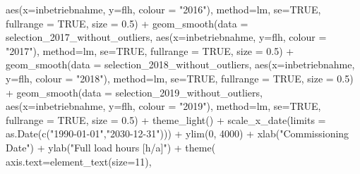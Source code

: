 \documentclass[a4paper,11pt]{article}
\newenvironment{Shaded}{\begin{snugshade}}{\end{snugshade}}
\newcommand{\AttributeTok}[1]{\textcolor[rgb]{0.77,0.63,0.00}{#1}}
\newcommand{\ConstantTok}[1]{\textcolor[rgb]{0.00,0.00,0.00}{#1}}
\newcommand{\DecValTok}[1]{\textcolor[rgb]{0.00,0.00,0.81}{#1}}
\newcommand{\FloatTok}[1]{\textcolor[rgb]{0.00,0.00,0.81}{#1}}
\newcommand{\FunctionTok}[1]{\textcolor[rgb]{0.00,0.00,0.00}{#1}}
\newcommand{\NormalTok}[1]{#1}
\newcommand{\SpecialCharTok}[1]{\textcolor[rgb]{0.00,0.00,0.00}{#1}}
\newcommand{\StringTok}[1]{\textcolor[rgb]{0.31,0.60,0.02}{#1}}
\begin{document}
\begin{Shaded}
\begin{Highlighting}[]
              \FunctionTok{aes}\NormalTok{(}\AttributeTok{x=}\NormalTok{inbetriebnahme, }\AttributeTok{y=}\NormalTok{flh, }\AttributeTok{colour =} \StringTok{"2016"}\NormalTok{), }
              \AttributeTok{method=}\NormalTok{lm, }\AttributeTok{se=}\ConstantTok{TRUE}\NormalTok{, }\AttributeTok{fullrange =} \ConstantTok{TRUE}\NormalTok{, }\AttributeTok{size =} \FloatTok{0.5}\NormalTok{)  }\SpecialCharTok{+}
  \FunctionTok{geom\_smooth}\NormalTok{(}\AttributeTok{data =}\NormalTok{ selection\_2017\_without\_outliers, }
              \FunctionTok{aes}\NormalTok{(}\AttributeTok{x=}\NormalTok{inbetriebnahme, }\AttributeTok{y=}\NormalTok{flh, }\AttributeTok{colour =} \StringTok{"2017"}\NormalTok{), }
              \AttributeTok{method=}\NormalTok{lm, }\AttributeTok{se=}\ConstantTok{TRUE}\NormalTok{, }\AttributeTok{fullrange =} \ConstantTok{TRUE}\NormalTok{, }\AttributeTok{size =} \FloatTok{0.5}\NormalTok{)  }\SpecialCharTok{+}
  \FunctionTok{geom\_smooth}\NormalTok{(}\AttributeTok{data =}\NormalTok{ selection\_2018\_without\_outliers, }
              \FunctionTok{aes}\NormalTok{(}\AttributeTok{x=}\NormalTok{inbetriebnahme, }\AttributeTok{y=}\NormalTok{flh, }\AttributeTok{colour =} \StringTok{"2018"}\NormalTok{),}
              \AttributeTok{method=}\NormalTok{lm, }\AttributeTok{se=}\ConstantTok{TRUE}\NormalTok{, }\AttributeTok{fullrange =} \ConstantTok{TRUE}\NormalTok{, }\AttributeTok{size =} \FloatTok{0.5}\NormalTok{)  }\SpecialCharTok{+}
  \FunctionTok{geom\_smooth}\NormalTok{(}\AttributeTok{data =}\NormalTok{ selection\_2019\_without\_outliers, }
              \FunctionTok{aes}\NormalTok{(}\AttributeTok{x=}\NormalTok{inbetriebnahme, }\AttributeTok{y=}\NormalTok{flh, }\AttributeTok{colour =} \StringTok{"2019"}\NormalTok{), }
              \AttributeTok{method=}\NormalTok{lm, }\AttributeTok{se=}\ConstantTok{TRUE}\NormalTok{, }\AttributeTok{fullrange =} \ConstantTok{TRUE}\NormalTok{, }\AttributeTok{size =} \FloatTok{0.5}\NormalTok{)  }\SpecialCharTok{+}
  \FunctionTok{theme\_light}\NormalTok{() }\SpecialCharTok{+}
  \FunctionTok{scale\_x\_date}\NormalTok{(}\AttributeTok{limits =} \FunctionTok{as.Date}\NormalTok{(}\FunctionTok{c}\NormalTok{(}\StringTok{"1990{-}01{-}01"}\NormalTok{,}\StringTok{"2030{-}12{-}31"}\NormalTok{))) }\SpecialCharTok{+}
  \FunctionTok{ylim}\NormalTok{(}\DecValTok{0}\NormalTok{, }\DecValTok{4000}\NormalTok{) }\SpecialCharTok{+}
  \FunctionTok{xlab}\NormalTok{(}\StringTok{"Commissioning Date"}\NormalTok{) }\SpecialCharTok{+}
  \FunctionTok{ylab}\NormalTok{(}\StringTok{"Full load hours [h/a]"}\NormalTok{) }\SpecialCharTok{+}
  \FunctionTok{theme}\NormalTok{( }\AttributeTok{axis.text=}\FunctionTok{element\_text}\NormalTok{(}\AttributeTok{size=}\DecValTok{11}\NormalTok{),}

\end{Highlighting}
\end{Shaded}
\end{document}
